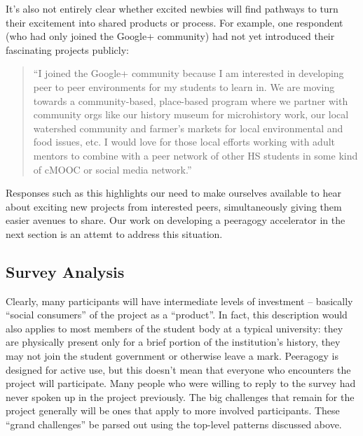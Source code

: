 \documentclass{acm_proc_article-sp}
\begin{document}
It's also not entirely clear whether excited newbies will find pathways to turn their excitement into shared products or process. For example, one respondent (who had only joined the Google+ community) had not yet introduced their fascinating projects publicly:

\begin{quote}
``I joined the Google+ community because I am interested in developing peer to peer environments for my students to learn in. We are moving towards a community-based, place-based program where we partner with community orgs like our history museum for microhistory work, our local watershed community and farmer's markets for local environmental and food issues, etc. I would love for those local efforts working with adult mentors to combine with a peer network of other HS students in some kind of cMOOC or social media network.''
\end{quote}

Responses such as this highlights our need to make ourselves available to hear about exciting new projects from interested peers, simultaneously giving them easier avenues to share. Our work on developing a peeragogy accelerator in the next section is an attemt to address this situation.

\subsection{Survey Analysis} \label{survey-analysis}

Clearly, many participants will have intermediate levels of investment -- basically ``social consumers'' of the project as a ``product''.  In fact, this description would also applies to most members of the student body at a typical university: they are physically present only for a brief portion of the institution's history, they may not join the student government or otherwise leave a mark.  Peeragogy is designed for active use, but this doesn't mean that everyone who encounters the project will participate.  Many people who were willing to reply to the survey had never spoken up in the project previously.  The big challenges that remain for the project generally will be ones that apply to more involved participants.  These ``grand challenges'' be parsed out using the top-level patterns discussed above. 
\end{document}
